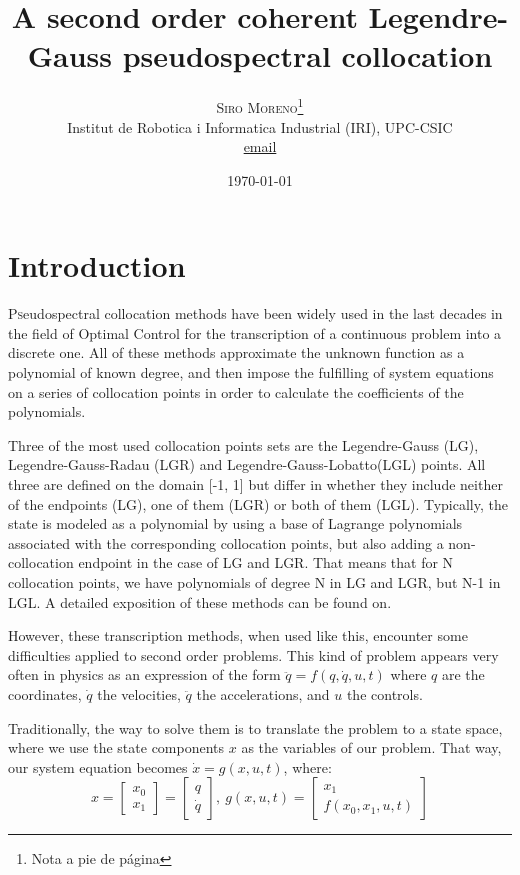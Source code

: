 \documentclass[twoside,twocolumn]{article}
\title{A second order coherent Legendre-Gauss pseudospectral collocation} %
\author{%
\textsc{Siro Moreno}\thanks{Nota a pie de página} \\[1ex] %
\normalsize Institut de Robotica i Informatica Industrial (IRI), UPC-CSIC \\ %
\normalsize \href{mailto:email}{email} %
}
\date{\today} %
\begin{document}
\maketitle


\section{Introduction}

\lettrine[nindent=0em,lines=3]{P}seudospectral collocation methods have been widely used in the last decades in the field of Optimal Control for the transcription of a continuous problem into a discrete one. All of these methods approximate the unknown function as a polynomial of known degree, and then impose the fulfilling of system equations on a series of collocation points in order to calculate the coefficients of the polynomials.

Three of the most used collocation points sets are the Legendre-Gauss (LG), Legendre-Gauss-Radau (LGR) and Legendre-Gauss-Lobatto(LGL) points. All three are defined on the domain [-1, 1] but differ in whether they include neither of the endpoints (LG), one of them (LGR) or both of them (LGL).
Typically, the state is modeled as a polynomial by using a base of Lagrange polynomials associated with the corresponding collocation points, but also adding a non-collocation endpoint in the case of LG and LGR. That means that for N collocation points, we have polynomials of degree N in LG and LGR, but N-1 in LGL. A detailed exposition of these methods can be found on\cite{garg_09}.

However, these transcription methods, when used like this, encounter some difficulties applied to second order problems. This kind of problem appears very often in physics as an expression of the form $\ddot{q} = f(q, \dot{q}, u, t)$ where $q$ are the coordinates, $\dot{q}$ the velocities, $\ddot{q}$ the accelerations, and $u$ the controls.

Traditionally, the way to solve them is to translate the problem to a state space, where we use the state components $x$ as the variables of our problem. That way, our system equation becomes $\dot{x} = g(x, u, t)$, where:
$$ x = \left[\begin{array}{c}x_0 \\ x_1\end{array} \right] = \left[\begin{array}{c}q \\ \dot{q}\end{array} \right],\ g(x, u, t) = \left[\begin{array}{c}x_1 \\ f(x_0, x_1, u, t)\end{array} \right] $$
\end{document}
